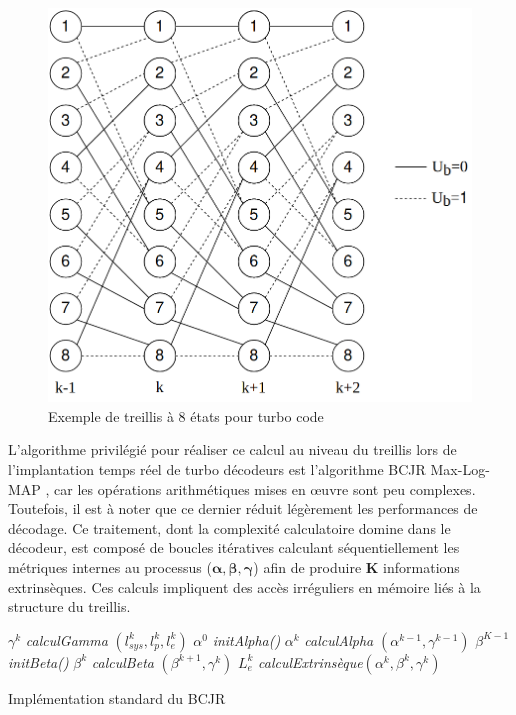\documentclass[../main.tex]{subfiles}
\begin{document}
\begin{figure}
    \centering
    \includegraphics[scale=0.3]{chapter2/figs/turbo_treillis.png}
    \caption{Exemple de treillis à 8 états pour turbo code}
    \label{TURBO2}
\end{figure}


L’algorithme privilégié pour réaliser ce calcul au niveau du treillis lors de l’implantation temps réel de turbo décodeurs est l’algorithme BCJR Max-Log-MAP \cite{BCJR2}, car les opérations arithmétiques mises en œuvre sont peu complexes. Toutefois, il est à noter que ce dernier réduit légèrement les performances de décodage.
Ce traitement, dont la complexité calculatoire domine dans le décodeur, est composé de boucles itératives calculant séquentiellement les métriques internes au processus ($ \bm{\alpha}, \bm{\beta}, \bm{\gamma}$) afin de produire $\bm{K}$ informations extrinsèques. Ces calculs impliquent des accès irréguliers en mémoire liés à la structure du treillis.

\begin{algorithm}[tb]
\small
    \begin{algorithmic}[1]
            \State $\gamma^k$ \leftarrow \textit{calculGamma} $(l^k_{sys},l^k_p,l^k_e)$ 
            \EndFor
            \State $\alpha^0$ \leftarrow \textit{initAlpha()}
            \State $\alpha^k$ \leftarrow \textit{calculAlpha} $(\alpha^{k-1},\gamma^{k-1})$ 
            \EndFor
            \State $\beta^{K-1}$ \leftarrow \textit{initBeta()}
            \State $\beta^k$ \leftarrow \textit{calculBeta} $(\beta^{k+1},\gamma^{k})$ 
            \EndFor
            \State $L^k_e$ \leftarrow \textit{calculExtrinsèque}$(\alpha^k,\beta^k,\gamma^k)$ 
            \EndFor
        \EndFor
        \end{algorithmic}
    \caption{Implémentation standard du BCJR}
    \label{algo:ref}
\end{algorithm}
\end{document}
